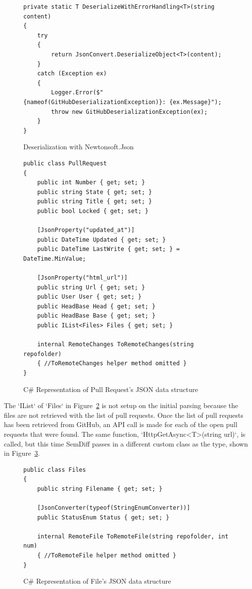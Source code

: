 \documentclass[draftclsnofoot,onecolumn]{IEEEtran}
\begin{document}
\begin{figure}[!htb]
\centering
\begin{lstlisting}
private static T DeserializeWithErrorHandling<T>(string content)
{
    try
    {
        return JsonConvert.DeserializeObject<T>(content);
    }
    catch (Exception ex)
    {
        Logger.Error($"{nameof(GitHubDeserializationException)}: {ex.Message}");
        throw new GitHubDeserializationException(ex);
  	}
}
\end{lstlisting}
\caption{Deserialization with Newtonsoft.Json}
\label{deserializeNewtonsoft}
\end{figure}



\begin{figure}[!htb]
\centering
\begin{lstlisting}
public class PullRequest
{
 	public int Number { get; set; }
    public string State { get; set; }
    public string Title { get; set; }
    public bool Locked { get; set; }
    
	[JsonProperty("updated_at")]
    public DateTime Updated { get; set; }
    public DateTime LastWrite { get; set; } = DateTime.MinValue;
    
	[JsonProperty("html_url")]
    public string Url { get; set; }
    public User User { get; set; }
    public HeadBase Head { get; set; }
    public HeadBase Base { get; set; }
    public IList<Files> Files { get; set; }
	
    internal RemoteChanges ToRemoteChanges(string repofolder)
    { //ToRemoteChanges helper method omitted }
}
\end{lstlisting}
\caption{C\# Representation of Pull Request’s JSON data structure}
\label{PullRequestCode}
\end{figure}

The `IList` of `Files` in Figure~\ref{PullRequestCode} is not setup on the 
initial parsing because the files are not retrieved with the list of pull 
requests. Once the list of pull requests has been retrieved from GitHub, an API 
call is made for each of the open pull requests that were found. The same 
function, `HttpGetAsync<T>(string url)`, is called, but this time SemDiff 
passes in a different custom class as the type, shown in 
Figure~\ref{GitHubFiles}.

\begin{figure}[!htb]
\centering
\begin{lstlisting}
public class Files
{
    public string Filename { get; set; }
	
    [JsonConverter(typeof(StringEnumConverter))]
    public StatusEnum Status { get; set; }
	
    internal RemoteFile ToRemoteFile(string repofolder, int num)	
    { //ToRemoteFile helper method omitted }
}
\end{lstlisting}
\caption{ C\# Representation of File's JSON data structure}
\label{GitHubFiles}
\end{figure}
\end{document}
